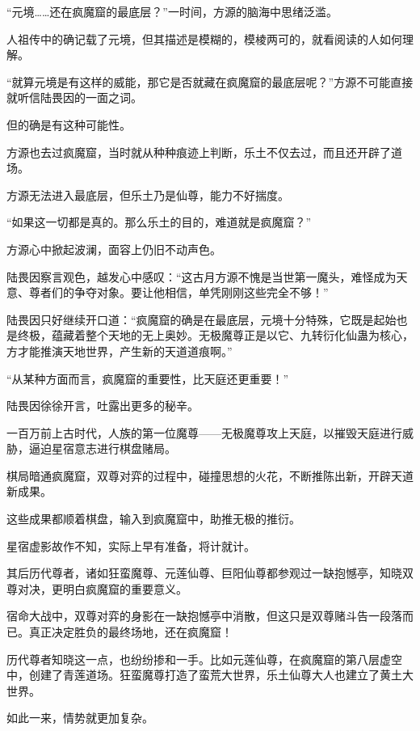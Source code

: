 
\begin{this_body}

“元境……还在疯魔窟的最底层？”一时间，方源的脑海中思绪泛滥。

人祖传中的确记载了元境，但其描述是模糊的，模棱两可的，就看阅读的人如何理解。

“就算元境是有这样的威能，那它是否就藏在疯魔窟的最底层呢？”方源不可能直接就听信陆畏因的一面之词。

但的确是有这种可能性。

方源也去过疯魔窟，当时就从种种痕迹上判断，乐土不仅去过，而且还开辟了道场。

方源无法进入最底层，但乐土乃是仙尊，能力不好揣度。

“如果这一切都是真的。那么乐土的目的，难道就是疯魔窟？”

方源心中掀起波澜，面容上仍旧不动声色。

陆畏因察言观色，越发心中感叹：“这古月方源不愧是当世第一魔头，难怪成为天意、尊者们的争夺对象。要让他相信，单凭刚刚这些完全不够！”

陆畏因只好继续开口道：“疯魔窟的确是在最底层，元境十分特殊，它既是起始也是终极，蕴藏着整个天地的无上奥妙。无极魔尊正是以它、九转衍化仙蛊为核心，方才能推演天地世界，产生新的天道道痕啊。”

“从某种方面而言，疯魔窟的重要性，比天庭还更重要！”

陆畏因徐徐开言，吐露出更多的秘辛。

一百万前上古时代，人族的第一位魔尊——无极魔尊攻上天庭，以摧毁天庭进行威胁，逼迫星宿意志进行棋盘赌局。

棋局暗通疯魔窟，双尊对弈的过程中，碰撞思想的火花，不断推陈出新，开辟天道新成果。

这些成果都顺着棋盘，输入到疯魔窟中，助推无极的推衍。

星宿虚影故作不知，实际上早有准备，将计就计。

其后历代尊者，诸如狂蛮魔尊、元莲仙尊、巨阳仙尊都参观过一缺抱憾亭，知晓双尊对决，更明白疯魔窟的重要意义。

宿命大战中，双尊对弈的身影在一缺抱憾亭中消散，但这只是双尊赌斗告一段落而已。真正决定胜负的最终场地，还在疯魔窟！

历代尊者知晓这一点，也纷纷掺和一手。比如元莲仙尊，在疯魔窟的第八层虚空中，创建了青莲道场。狂蛮魔尊打造了蛮荒大世界，乐土仙尊大人也建立了黄土大世界。

如此一来，情势就更加复杂。


\end{this_body}
